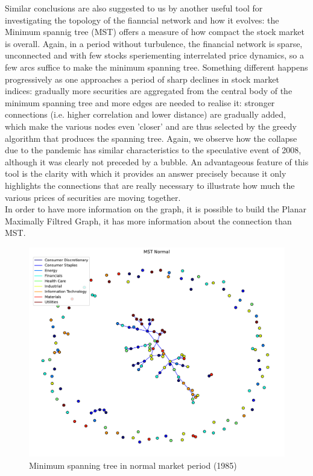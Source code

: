 \documentclass[sigchi]{acmart}
\begin{document}
Similar conclusions are also suggested to us by another useful tool for investigating the topology of the fianncial network and how it evolves: the Minimum spannig tree (MST) \cite{MST} offers a measure of how compact the stock market is overall. Again, in a period without turbulence, the financial network is sparse, unconnected and with few stocks speriementing interrelated price dynamics, so a few arcs suffice to make the minimum spanning tree. Something different happens progressively as one approaches a period of sharp declines in stock market indices: gradually more securities are aggregated from the central body of the minimum spanning tree and more edges are needed to realise it: stronger connections (i.e. higher correlation and lower distance) are gradually added, which make the various nodes even 'closer' and are thus selected by the greedy algorithm that produces the spanning tree.
Again, we observe how the collapse due to the pandemic has similar characteristics to the speculative event of 2008, although it was clearly not preceded by a bubble.
An advantageous feature of this tool is the clarity with which it provides an answer precisely because it only highlights the connections that are really necessary to illustrate how much the various prices of securities are moving together.\\
In order to have more information on the graph, it is possible to build the Planar Maximally Filtred Graph\cite{PMFG}, it has more information about the connection than MST.\\
\begin{figure}[H]
	\centering
	\includegraphics[width=\linewidth]{MST Normal.pdf}
	\caption{Minimum spanning tree in normal market period (1985)}
\end{figure}
\end{document}
